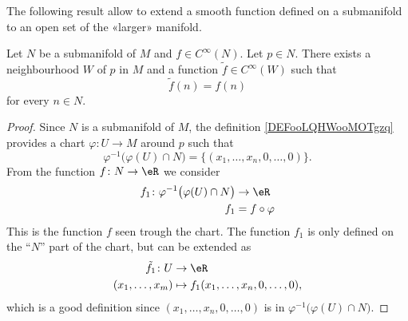 The following result allow to extend a smooth function defined on a submanifold to an open set of the «larger» manifold.
\begin{proposition}     \label{PROPooOTZQooIfboXV}
	Let \( N\) be a submanifold of \( M\) and \( f\in  C^{\infty}(N)\). Let \( p\in N\). There exists a neighbourhood \( W\) of \( p\) in \( M\) and a function \( \tilde f\in  C^{\infty}(W)\) such that
	\begin{equation}
		\tilde f(n)=f(n)
	\end{equation}
	for every \( n\in N\).
\end{proposition}

\begin{proof}
	Since \( N\) is a submanifold of \( M\), the definition \ref{DEFooLQHWooMOTgzq} provides a chart \( \varphi\colon U\to M\) around \( p\) such that
	\begin{equation}
		\varphi^{-1}\big( \varphi(U)\cap N \big)=\{ (x_1,\ldots, x_n,0,\ldots, 0) \}.
	\end{equation}
	From the function \( f\colon N\to \eR\) we consider
	\begin{equation}
		\begin{aligned}
			f_1\colon \varphi^{-1}\big( \varphi(U)\cap N \big) & \to \eR        \\
			f_1                                                & =f\circ\varphi
		\end{aligned}
	\end{equation}
	This is the function \( f\) seen trough the chart. The function \( f_1\) is only defined on the ``\( N\)'' part of the chart, but can be extended as
	\begin{equation}
		\begin{aligned}
			\tilde f_1\colon U & \to \eR                                   \\
			(x_1,\ldots, x_m)  & \mapsto f_1(x_1,\ldots, x_n,0,\ldots, 0),
		\end{aligned}
	\end{equation}
	which is a good definition since \( (x_1,\ldots, x_n,0,\ldots, 0)\) is in \( \varphi^{-1}\big( \varphi(U)\cap N \big)\).


\end{proof}
